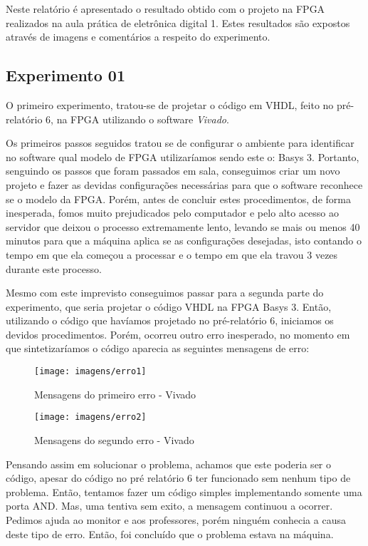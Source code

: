 \documentclass[12pts]{article}
\begin{document}
	Neste relatório é apresentado o resultado obtido com o projeto na FPGA realizados na aula prática de eletrônica digital 1. Estes resultados são expostos através de imagens e comentários a respeito do experimento. 

\subsection{Experimento 01}
\singlespacing
	O primeiro experimento, tratou-se de projetar o código em VHDL, feito no pré-relatório 6, na FPGA utilizando o software \textit{Vivado}. 

	Os primeiros passos seguidos tratou se de configurar o ambiente para identificar no software qual modelo de FPGA utilizaríamos sendo este o: Basys 3. Portanto, senguindo os passos que foram passados em sala, conseguimos criar um novo projeto e fazer as devidas configurações necessárias para que o software reconhece se o modelo da FPGA. Porém, antes de concluir estes procedimentos, de forma inesperada, fomos muito prejudicados pelo computador e pelo alto acesso ao servidor que deixou o processo extremamente lento, levando se mais ou menos 40 minutos para que a máquina aplica se as configurações desejadas, isto contando o tempo em que ela começou a processar e o tempo em que ela travou 3 vezes durante este processo. 
	
	Mesmo com este imprevisto conseguimos passar para a segunda parte do experimento, que seria projetar o código VHDL na FPGA Basys 3. Então, utilizando o código que havíamos projetado no pré-relatório 6, iniciamos os devidos procedimentos. Porém, ocorreu outro erro inesperado, no momento em que sintetizaríamos o código aparecia as seguintes mensagens de erro:

\clearpage
\begin{figure}[!htb]
  \centering
  \texttt{[image: imagens/erro1]}
  \caption{Mensagens do primeiro erro - Vivado}	
  \label{figRotulo}
\end{figure}

\clearpage
\begin{figure}[!htb]
  \centering
  \texttt{[image: imagens/erro2]}
  \caption{Mensagens do segundo erro - Vivado}	
  \label{figRotulo}
\end{figure}
	
	Pensando assim em solucionar o problema, achamos que este poderia ser o código, apesar do código no pré relatório 6 ter funcionado sem nenhum tipo de problema. Então, tentamos fazer um código simples implementando somente uma porta AND. Mas, uma tentiva sem exito, a mensagem continuou a ocorrer. Pedimos ajuda ao monitor e aos professores, porém ninguém conhecia a causa deste tipo de erro. Então, foi concluído que o problema estava na máquina.  
\end{document}
